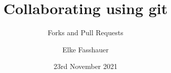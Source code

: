 \documentclass[xcolor=dvipsnames]{beamer}
\begin{document}
 

\title[]
{Collaborating using git}
\subtitle{Forks and Pull Requests}
\author[E. Fasshauer]{Elke Fasshauer}
\date[23.11.21]{23rd November 2021}


\begin{frame}
\titlepage
\end{frame}

%
















%
%
%
%
%
%
%
%
%
\end{document}
